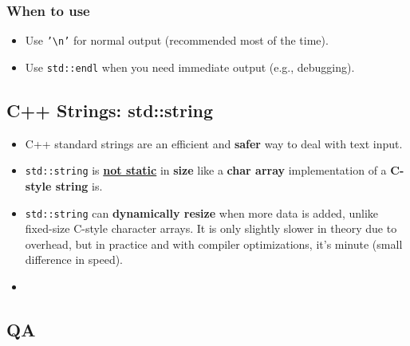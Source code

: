 \documentclass[10pt]{article}
\begin{document}
\begin{itemize}
	\subsubsection*{When to use}
	\begin{itemize}
		\item Use \texttt{'\textbackslash n'} for normal output (recommended most of the time).
		\item Use \texttt{std::endl} when you need immediate output (e.g., debugging).
	\end{itemize}
\end{itemize}

\newpage

\subsection{C++ Strings: std::string}

\begin{itemize}
	\item C++ standard strings are an efficient and \textbf{safer} way to deal with text input.
	\item \verb|std::string| is \underline{\textbf{not static}} in \textbf{size} like a \textbf{char array} implementation of a \textbf{C-style string} is.
\item \verb|std::string| can \textbf{dynamically resize} when more data is added, unlike fixed-size C-style character arrays. It is only slightly slower in theory due to overhead, but in practice and with compiler optimizations, it's minute (small difference in speed).
\item {}
\end{itemize}

\newpage 

\subsection{QA}
\end{document}
